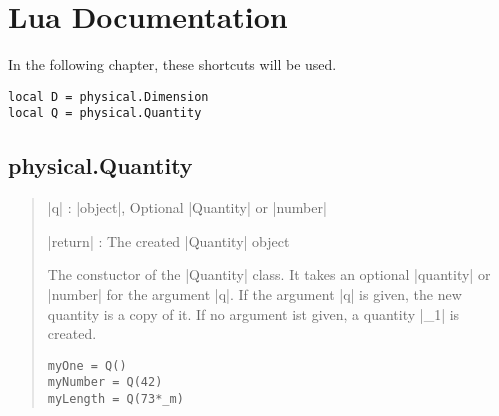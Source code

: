 \documentclass{ltxdoc}
\begin{document}
\newpage
\section{Lua Documentation}

In the following chapter, these shortcuts will be used.
\begin{lstlisting}
local D = physical.Dimension
local Q = physical.Quantity
\end{lstlisting}


\subsection{physical.Quantity}



\begin{quote}
  \begin{description}
  \item |q| : |object|, Optional |Quantity| or |number|

  \item |return| : The created |Quantity| object
  \end{description}

  The constuctor of the |Quantity| class. It takes an optional |quantity| or |number| for the argument |q|. If the argument |q| is given, the new quantity is a copy of it. If no argument ist given, a quantity |_1| is created.

  \begin{lstlisting}
myOne = Q()
myNumber = Q(42)
myLength = Q(73*_m)
  \end{lstlisting}
\end{quote}
\end{document}
